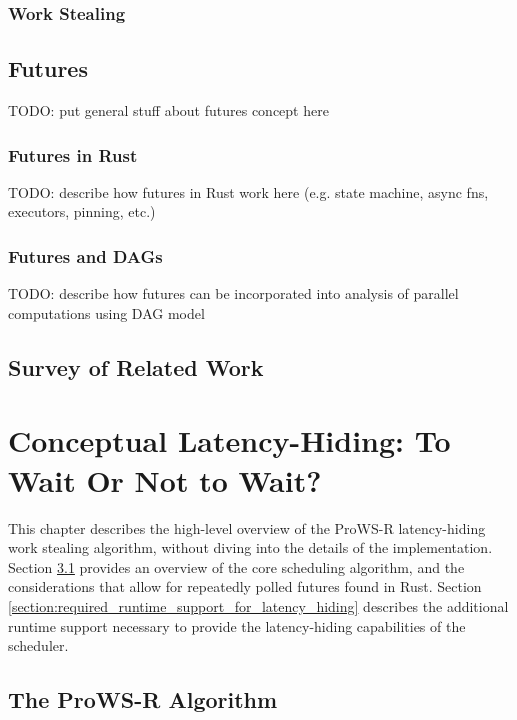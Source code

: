 \documentclass[bsc,frontabs,singlespacing,parskip,deptreport,normalheadings]{infthesis}
\begin{document}
\subsection{Work Stealing}
\label{subsection:work_stealing}

\section{Futures}
\label{section:futures}

TODO: put general stuff about futures concept here

\subsection{Futures in Rust}
\label{subsection:futures_in_rust}

TODO: describe how futures in Rust work here (e.g. state machine, async fns,
executors, pinning, etc.)

\subsection{Futures and DAGs}

TODO: describe how futures can be incorporated into analysis of parallel
computations using DAG model

\section{Survey of Related Work}


\chapter{Conceptual Latency-Hiding: To Wait Or Not to Wait?}

This chapter describes the high-level overview of the ProWS-R latency-hiding
work stealing algorithm, without diving into the details of the implementation.
Section \ref{section:overview_of_the_prows_algorithm} provides an overview of
the core scheduling algorithm, and the considerations that allow for repeatedly
polled futures found in Rust. Section
\ref{section:required_runtime_support_for_latency_hiding} describes the
additional runtime support necessary to provide the latency-hiding capabilities
of the scheduler.


\section{The ProWS-R Algorithm}
\label{section:overview_of_the_prows_algorithm}
\end{document}
